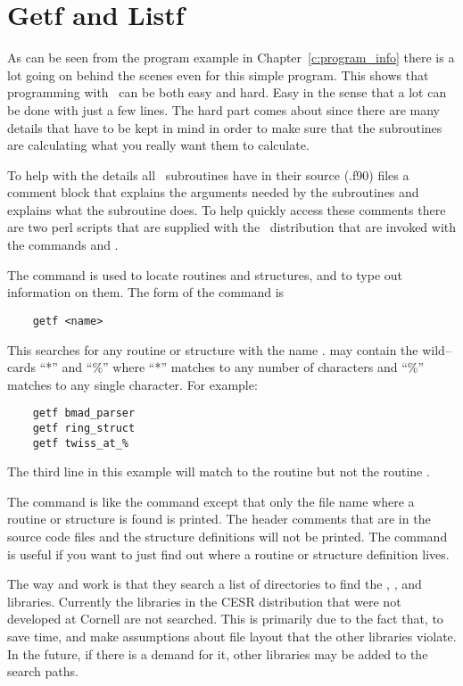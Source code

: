 \section{Getf and Listf}
\label{s:getf}

As can be seen from the program example in Chapter~\ref{c:program_info}
there is a lot going on behind the scenes even for this
simple program. This shows that programming with \bmad\ can be both easy
and hard. Easy in the sense that a lot can be done with just a few
lines. The hard part comes about since there are many details that
have to be kept in mind in order to make sure that the subroutines
are calculating what you really want them to calculate.

To help with the details all \bmad\ subroutines have in their source (.f90)
files a comment block that explains the arguments needed by the
subroutines and explains what the subroutine does. To help quickly
access these comments there are two perl scripts that are supplied
with the \bmad\ distribution that are invoked with the commands
 and .

The  command is used to locate routines and structures, and
to type out information on them.  The form of the command is
\begin{verbatim}
    getf <name>
\end{verbatim}
This searches for any routine or structure with the name
.  may contain the wild--cards ``*'' and ``\%'' where
``*'' matches to any number of characters and ``\%'' matches to any
single character. For example:
\begin{verbatim}
    getf bmad_parser
    getf ring_struct
    getf twiss_at_%
\end{verbatim}
The third line in this example will match to the routine
 but not the routine .

The  command is like the  command except that only
the file name where a routine or structure is found is printed. The
header comments that are in the source code files and the structure
definitions will not be printed. The  command is useful if you
want to just find out where a routine or structure definition lives.

The way  and  work is that they search a list of
directories to find the \bmad, , and 
libraries. Currently the libraries in the CESR distribution that were
not developed at Cornell are not searched. This is primarily due to
the fact that, to save time,  and  make assumptions
about file layout that the other libraries violate. In the future, if
there is a demand for it, other libraries may be added to the search
paths.

